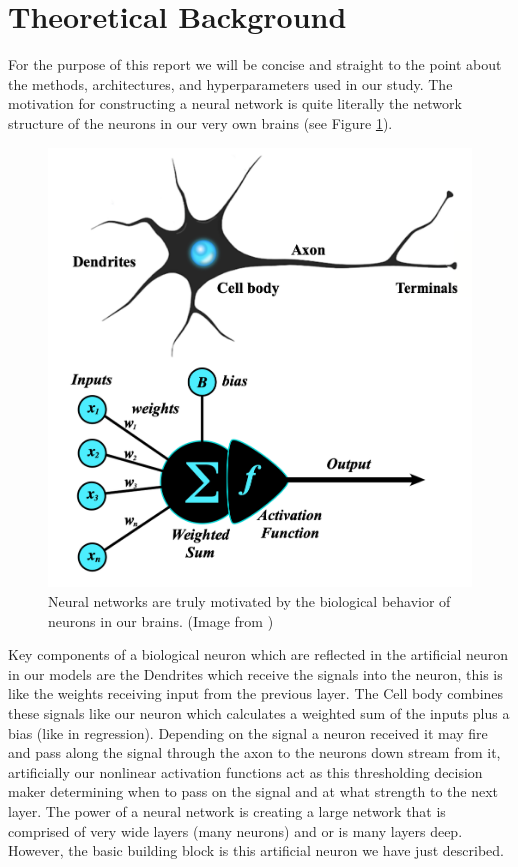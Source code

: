 \documentclass[10pt]{amsart}
\begin{document}
\section{Theoretical Background}\label{sec:theory}
For the purpose of this report we will be concise and straight to the point about the methods, architectures, and hyperparameters used in our study.
The motivation for constructing a neural network is quite literally the network structure of the neurons in our very own brains (see Figure \ref{fig:neuron}).

\begin{figure}[h]
	\centering
	\includegraphics[width=.3\textwidth]{../visualizations/perceptron-with-neuron.png}
 	\caption{Neural networks are truly motivated by the biological behavior of neurons in our brains. (Image from \cite{mriquestionsDeepLearning})}\label{fig:neuron}
\end{figure}

Key components of a biological neuron which are reflected in the artificial neuron in our models are the Dendrites which receive the signals into the neuron, this is like the weights receiving input from the previous layer.
The Cell body combines these signals like our neuron which calculates a weighted sum of the inputs plus a bias (like in regression).
Depending on the signal a neuron received it may fire and pass along the signal through the axon to the neurons down stream from it, artificially our nonlinear activation functions act as this thresholding decision maker determining when to pass on the signal and at what strength to the next layer.
The power of a neural network is creating a large network that is comprised of very wide layers (many neurons) and or is many layers deep.
However, the basic building block is this artificial neuron we have just described.
\end{document}
